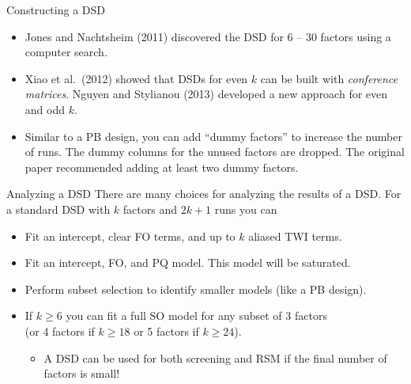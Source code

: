 \documentclass[9pt]{beamer}
\begin{document}
\begin{frame}{Constructing a DSD}
\begin{itemize}
	\item Jones and Nachtsheim (2011) discovered the DSD for 6 -- 30 factors using a computer search.
	\item Xiao et al.\ (2012) showed that DSDs for even $k$ can be built with \emph{conference matrices}. Nguyen and Stylianou (2013) developed a new approach for even and odd $k$.
	\pause
	\item Similar to a PB design, you can add ``dummy factors'' to increase the number of runs. The dummy columns for the unused factors are dropped. The original paper recommended adding at least two dummy factors.
\end{itemize}	
\end{frame}

\begin{frame}{Analyzing a DSD}
There are many choices for analyzing the results of a DSD. For a standard DSD with $k$ factors and $2k+1$ runs you can
\begin{itemize}
	\item Fit an intercept, clear FO terms, and up to $k$ aliased TWI terms.
	\item Fit an intercept, FO, and PQ model. This model will be saturated.
	\item Perform subset selection to identify smaller models (like a PB design).
	\item If $k\ge6$ you can fit a full SO model for any subset of 3 factors\\(or 4 factors if $k\ge18$ or 5 factors if $k\ge24$).
	\pause
	\begin{itemize}
		\item A DSD can be used for both screening and RSM if the final number of factors is small!
	\end{itemize}
\end{itemize}	
\end{frame}
\end{document}

